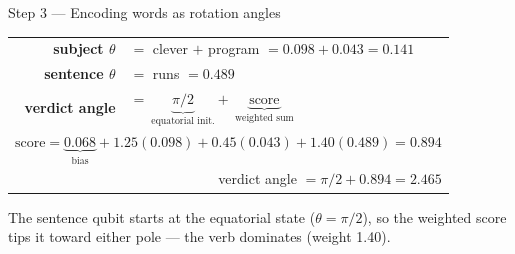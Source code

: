 \documentclass[final]{beamer}
\newlength{\colwidth}
\begin{document}
\begin{frame}[t]
\begin{columns}[t]
\begin{column}{\colwidth}
\begin{block}{Step 3 --- Encoding words as rotation angles}
    \medskip
    \begin{center}\large
    \begin{tabular}{r l}
      {\color{nouncol!60!black}\textbf{subject $\theta$}}  & $=$ clever $+$ program $= 0.098+0.043 = \mathbf{0.141}$\\[4pt]
      {\color{verbcol!60!black}\textbf{sentence $\theta$}} & $=$ runs $= \mathbf{0.489}$\\[4pt]
      \textbf{verdict angle} & $=\ \underbrace{\pi/2}_{\text{equatorial init.}}+\ \underbrace{\text{score}}_{\text{weighted sum}}$\\[10pt]
      \multicolumn{2}{r}{$\text{score}=\underbrace{0.068}_{\text{bias}}+1.25(0.098)+0.45(0.043)+1.40(0.489)=0.894$}\\[6pt]
      \multicolumn{2}{r}{verdict angle $=\pi/2+0.894=\mathbf{2.465}$}
    \end{tabular}
    \end{center}
    \smallskip
    The sentence qubit starts at the equatorial state ($\theta=\pi/2$),
    so the weighted score tips it toward either pole --- the verb
    dominates (weight 1.40).


\end{block}
\end{column}
\end{columns}
\end{frame}
\end{document}
